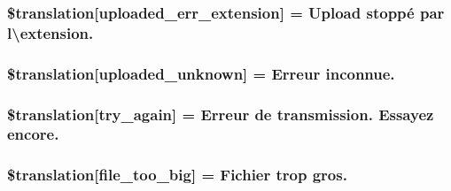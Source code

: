 \subsubsection[{\$translation}]{\setlength{\rightskip}{0pt plus 5cm}\$translation\mbox{[}\textquotesingle{}uploaded\+\_\+err\+\_\+extension\textquotesingle{}\mbox{]} = \textquotesingle{}Upload stoppé par l\textbackslash{}\textquotesingle{}extension.\textquotesingle{}}\label{class_8upload_8fr___f_r_8php_a01c69a4c8556602b3892dce727bace11}
\hypertarget{class_8upload_8fr___f_r_8php_a4a9168e922b827e6a28b5db1c00774ca}{}
\subsubsection[{\$translation}]{\setlength{\rightskip}{0pt plus 5cm}\$translation\mbox{[}\textquotesingle{}uploaded\+\_\+unknown\textquotesingle{}\mbox{]} = \textquotesingle{}Erreur inconnue.\textquotesingle{}}\label{class_8upload_8fr___f_r_8php_a4a9168e922b827e6a28b5db1c00774ca}
\hypertarget{class_8upload_8fr___f_r_8php_a3afc377bd803683314f413a814243066}{}
\subsubsection[{\$translation}]{\setlength{\rightskip}{0pt plus 5cm}\$translation\mbox{[}\textquotesingle{}try\+\_\+again\textquotesingle{}\mbox{]} = \textquotesingle{}Erreur de transmission. Essayez encore.\textquotesingle{}}\label{class_8upload_8fr___f_r_8php_a3afc377bd803683314f413a814243066}
\hypertarget{class_8upload_8fr___f_r_8php_a476278eb4a0c3df56af068e2d511a741}{}
\subsubsection[{\$translation}]{\setlength{\rightskip}{0pt plus 5cm}\$translation\mbox{[}\textquotesingle{}file\+\_\+too\+\_\+big\textquotesingle{}\mbox{]} = \textquotesingle{}Fichier trop gros.\textquotesingle{}}\label{class_8upload_8fr___f_r_8php_a476278eb4a0c3df56af068e2d511a741}
\hypertarget{class_8upload_8fr___f_r_8php_a191a55df8e3bb7f3c51b70f3c1932e02}{}
